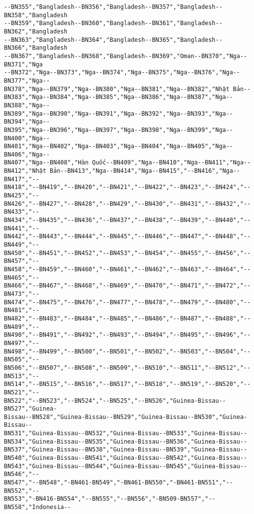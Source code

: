 \documentclass[11pt]{article}
\begin{document}
\begin{tcolorbox}[breakable, size=fbox, boxrule=.5pt, pad at break*=1mm, opacityfill=0]
\begin{Verbatim}[commandchars=\\\{\}]
--BN355","Bangladesh--BN356","Bangladesh--BN357","Bangladesh--BN358","Bangladesh
--BN359","Bangladesh--BN360","Bangladesh--BN361","Bangladesh--BN362","Bangladesh
--BN363","Bangladesh--BN364","Bangladesh--BN365","Bangladesh--BN366","Bangladesh
--BN367","Bangladesh--BN368","Bangladesh--BN369","Oman--BN370","Nga--BN371","Nga
--BN372","Nga--BN373","Nga--BN374","Nga--BN375","Nga--BN376","Nga--BN377","Nga--
BN378","Nga--BN379","Nga--BN380","Nga--BN381","Nga--BN382","Nhật Bản--
BN383","Nga--BN384","Nga--BN385","Nga--BN386","Nga--BN387","Nga--BN388","Nga--
BN389","Nga--BN390","Nga--BN391","Nga--BN392","Nga--BN393","Nga--BN394","Nga--
BN395","Nga--BN396","Nga--BN397","Nga--BN398","Nga--BN399","Nga--BN400","Nga--
BN401","Nga--BN402","Nga--BN403","Nga--BN404","Nga--BN405","Nga--BN406","Nga--
BN407","Nga--BN408","Hàn Quốc--BN409","Nga--BN410","Nga--BN411","Nga--
BN412","Nhật Bản--BN413","Nga--BN414","Nga--BN415","--BN416","Nga--BN417","--
BN418","--BN419","--BN420","--BN421","--BN422","--BN423","--BN424","--BN425","--
BN426","--BN427","--BN428","--BN429","--BN430","--BN431","--BN432","--BN433","--
BN434","--BN435","--BN436","--BN437","--BN438","--BN439","--BN440","--BN441","--
BN442","--BN443","--BN444","--BN445","--BN446","--BN447","--BN448","--BN449","--
BN450","--BN451","--BN452","--BN453","--BN454","--BN455","--BN456","--BN457","--
BN458","--BN459","--BN460","--BN461","--BN462","--BN463","--BN464","--BN465","--
BN466","--BN467","--BN468","--BN469","--BN470","--BN471","--BN472","--BN473","--
BN474","--BN475","--BN476","--BN477","--BN478","--BN479","--BN480","--BN481","--
BN482","--BN483","--BN484","--BN485","--BN486","--BN487","--BN488","--BN489","--
BN490","--BN491","--BN492","--BN493","--BN494","--BN495","--BN496","--BN497","--
BN498","--BN499","--BN500","--BN501","--BN502","--BN503","--BN504","--BN505","--
BN506","--BN507","--BN508","--BN509","--BN510","--BN511","--BN512","--BN513","--
BN514","--BN515","--BN516","--BN517","--BN518","--BN519","--BN520","--BN521","--
BN522","--BN523","--BN524","--BN525","--BN526","Guinea-Bissau--BN527","Guinea-
Bissau--BN528","Guinea-Bissau--BN529","Guinea-Bissau--BN530","Guinea-Bissau--
BN531","Guinea-Bissau--BN532","Guinea-Bissau--BN533","Guinea-Bissau--
BN534","Guinea-Bissau--BN535","Guinea-Bissau--BN536","Guinea-Bissau--
BN537","Guinea-Bissau--BN538","Guinea-Bissau--BN539","Guinea-Bissau--
BN540","Guinea-Bissau--BN541","Guinea-Bissau--BN542","Guinea-Bissau--
BN543","Guinea-Bissau--BN544","Guinea-Bissau--BN545","Guinea-Bissau--BN546","--
BN547","--BN548","-BN461-BN549","-BN461-BN550","-BN461-BN551","--BN552","--
BN553","-BN416-BN554","--BN555","--BN556","-BN509-BN557","--BN558","Indonesia--

\end{Verbatim}
\end{tcolorbox}
\end{document}
